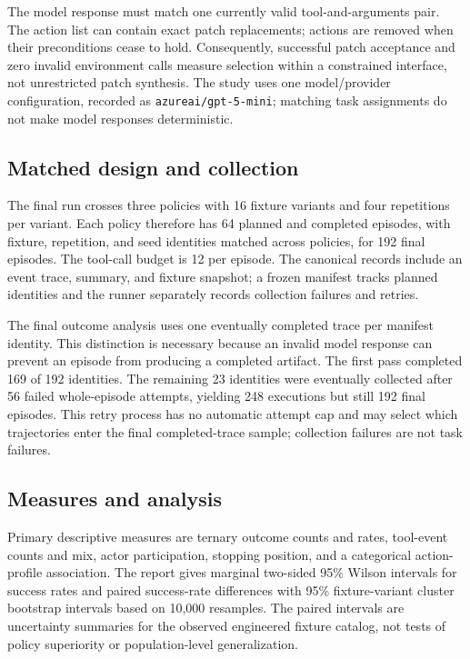 \documentclass[pdflatex,sn-basic,Numbered]{sn-jnl}
\begin{document}
The model response must match one currently valid tool-and-arguments pair. The action list can contain exact patch replacements; actions are removed when their preconditions cease to hold. Consequently, successful patch acceptance and zero invalid environment calls measure selection within a constrained interface, not unrestricted patch synthesis. The study uses one model/provider configuration, recorded as \texttt{azureai/gpt-5-mini}; matching task assignments do not make model responses deterministic.

\subsection{Matched design and collection}

The final run crosses three policies with 16 fixture variants and four repetitions per variant. Each policy therefore has 64 planned and completed episodes, with fixture, repetition, and seed identities matched across policies, for 192 final episodes. The tool-call budget is 12 per episode. The canonical records include an event trace, summary, and fixture snapshot; a frozen manifest tracks planned identities and the runner separately records collection failures and retries.

The final outcome analysis uses one eventually completed trace per manifest identity. This distinction is necessary because an invalid model response can prevent an episode from producing a completed artifact. The first pass completed 169 of 192 identities. The remaining 23 identities were eventually collected after 56 failed whole-episode attempts, yielding 248 executions but still 192 final episodes. This retry process has no automatic attempt cap and may select which trajectories enter the final completed-trace sample; collection failures are not task failures.

\subsection{Measures and analysis}

Primary descriptive measures are ternary outcome counts and rates, tool-event counts and mix, actor participation, stopping position, and a categorical action-profile association. The report gives marginal two-sided 95\% Wilson intervals for success rates and paired success-rate differences with 95\% fixture-variant cluster bootstrap intervals based on 10,000 resamples. The paired intervals are uncertainty summaries for the observed engineered fixture catalog, not tests of policy superiority or population-level generalization.
\end{document}
